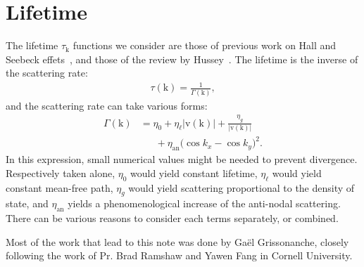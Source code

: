 \documentclass[aps,twocolumn,showpacs,nofootinbib]{revtex4-1}
\renewcommand{\vec}[1]{\bm{\mathrm{#1}}}
\begin{document}
\section{Lifetime}\label{section_lifetime}

The lifetime $\tau_{\vec k}$ functions we consider are those of previous work on Hall and Seebeck effets~\cite{verret_phenomenological_2017}, and those of the review by Hussey~\cite{hussey_phenomenology_2008}. The lifetime is the inverse of the scattering rate:
\begin{align}
\tau(\vec k)=\frac{1}{\Gamma(\vec k)},
\end{align}
and the scattering rate can take various forms:
\begin{align}
\Gamma(\vec k) 
&=\eta_0
+ \eta_{\ell}|\vec v(\vec k)|
+ \frac{\eta_{g}}{|\vec v(\vec k)|}
\nonumber\\&
\phantom{=\ }
+ \eta_{\text{an}}\big(\cos k_x - \cos k_y\big)^2.
\end{align}
In this expression, small numerical values might be needed to prevent divergence. Respectively taken alone, $\eta_0$ would yield constant lifetime, $\eta_\ell$ would yield constant mean-free path, $\eta_g$ would yield scattering proportional to the density of state, and $\eta_{\text{an}}$ yields a phenomenological increase of the anti-nodal scattering. There can be various reasons to consider each terms separately, or combined.


\begin{acknowledgments}
Most of the work that lead to this note was done by Gaël Grissonanche, closely following the work of Pr. Brad Ramshaw and Yawen Fang in Cornell University.
\end{acknowledgments}



\end{document}
